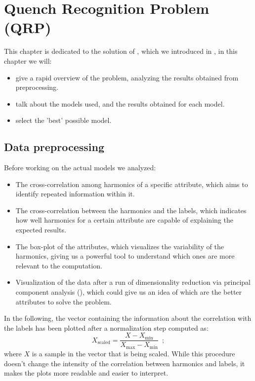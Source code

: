\chapter{Quench Recognition Problem (QRP)}
\label{chp:qrp}
This chapter is dedicated to the solution of \qrp, which we introduced in , in this chapter we will:
\begin{itemize}
	\item give a rapid overview of the problem, analyzing the results obtained from
	      preprocessing.
	\item talk about the models used, and the results obtained for each model.
	\item select the 'best' possible model.
\end{itemize}

\section{Data preprocessing}
\label{sec:qrp-preprocessing}
Before working on the actual models we analyzed:
\begin{itemize}
	\item The cross-correlation among harmonics of a specific attribute, which aims to identify repeated
	      information within it.
	\item The cross-correlation between the harmonics and the labels, which indicates how
	      well harmonics for a certain attribute are capable of explaining the expected results.
	\item The box-plot of the attributes, which visualizes the variability of the harmonics,
	      giving us a powerful tool to understand which ones are more relevant to the
	      computation.
	\item Visualization of the data after a run of dimensionality reduction via principal component
	      analysis (\pca), which could give us an idea of which are the better attributes to solve the problem.
\end{itemize}
In the following, the vector containing the information about the correlation with the labels has
been plotted after a normalization step computed as:
\begin{equation}
	\label{eq:normalization}
	X_\text{scaled} = \frac{X - X_\text{min}}{X_\text{max} - X_\text{min}} \enspace;
\end{equation}
where $X$ is a sample in the vector that is being scaled. While this procedure doesn't change the intensity of the correlation between harmonics and labels, it makes the plots more readable and easier to interpret.

